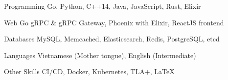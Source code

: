 


\begin{cvskills}


\cvskill
{Programming} %
{Go, Python, C++14, Java, JavaScript, Rust, Elixir} %


\cvskill
{Web} %
{Go gRPC \& gRPC Gateway, Phoenix with Elixir, ReactJS frontend} %

\cvskill
{Databases} %
{MySQL, Memcached, Elasticsearch, Redis, PostgreSQL, etcd} %


\cvskill
{Languages} %
{Vietnamese (Mother tongue), English (Intermediate)} %


\cvskill
{Other Skills} %
{CI/CD, Docker, Kubernetes, TLA+, LaTeX}%


\end{cvskills}
